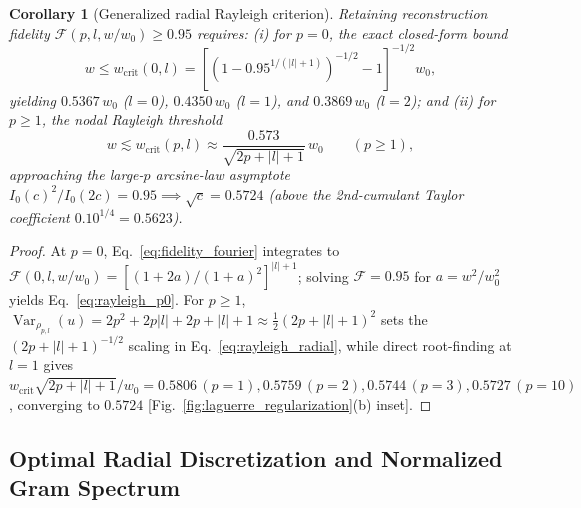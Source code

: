 \documentclass[aps,pra,reprint,amsmath,amssymb,floatfix,longbibliography]{revtex4-2}
\providecommand{\abs}[1]{\lvert#1\rvert}
\newtheorem{corollary}{Corollary}
\begin{document}
\begin{corollary}[Generalized radial Rayleigh criterion]
\label{cor:rayleigh_radial}
Retaining reconstruction fidelity $\mathcal{F}(p,l,w/w_0) \ge 0.95$ requires: (i) for $p = 0$, the exact closed-form bound
\begin{equation}
w \le w_{\mathrm{crit}}(0,l) = \left[\left(1 - 0.95^{1/(\abs{l}+1)}\right)^{-1/2} - 1\right]^{-1/2} w_0,
\label{eq:rayleigh_p0}
\end{equation}
yielding $0.5367\,w_0$ ($l=0$), $0.4350\,w_0$ ($l=1$), and $0.3869\,w_0$ ($l=2$); and (ii) for $p \ge 1$, the nodal Rayleigh threshold
\begin{equation}
w \lesssim w_{\mathrm{crit}}(p,l) \approx \frac{0.573}{\sqrt{2p + \abs{l} + 1}}\,w_0 \qquad (p \ge 1),
\label{eq:rayleigh_radial}
\end{equation}
approaching the large-$p$ arcsine-law asymptote $I_0(c)^2/I_0(2c) = 0.95 \implies \sqrt{c} = 0.5724$ (above the 2nd-cumulant Taylor coefficient $0.10^{1/4} = 0.5623$).
\end{corollary}
\begin{proof}
At $p=0$, Eq.~\eqref{eq:fidelity_fourier} integrates to $\mathcal{F}(0,l,w/w_0) = [(1+2a)/(1+a)^2]^{\abs{l}+1}$; solving $\mathcal{F} = 0.95$ for $a = w^2/w_0^2$ yields Eq.~\eqref{eq:rayleigh_p0}. For $p \ge 1$, $\operatorname{Var}_{\rho_{p,l}}(u) = 2p^2 + 2p\abs{l} + 2p + \abs{l} + 1 \approx \frac{1}{2}(2p+\abs{l}+1)^2$ sets the $(2p+\abs{l}+1)^{-1/2}$ scaling in Eq.~\eqref{eq:rayleigh_radial}, while direct root-finding at $l=1$ gives $w_{\mathrm{crit}}\sqrt{2p+\abs{l}+1}/w_0 = 0.5806\,(p=1), 0.5759\,(p=2), 0.5744\,(p=3), 0.5727\,(p=10)$, converging to $0.5724$ [Fig.~\ref{fig:laguerre_regularization}(b) inset].
\end{proof}

\subsection{Optimal Radial Discretization and Normalized Gram Spectrum}
\label{subsec:gram_sampling}
\end{document}
